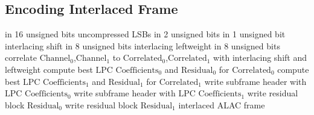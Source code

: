 \clearpage

\subsection{Encoding Interlaced Frame}
{
 in 16 unsigned bits
\WRITE uncompressed LSBs in 2 unsigned bits\;
 in 1 unsigned bit
\WRITE interlacing shift in 8 unsigned bits\;
\WRITE interlacing leftweight in 8 unsigned bits\;
correlate $\text{Channel}_0$,$\text{Channel}_1$ to $\text{Correlated}_0$,$\text{Correlated}_1$ with interlacing shift and leftweight\;
compute best $\text{LPC Coefficients}_0$ and $\text{Residual}_0$ for $\text{Correlated}_0$\;
compute best $\text{LPC Coefficients}_1$ and $\text{Residual}_1$ for $\text{Correlated}_1$\;
write subframe header with $\text{LPC Coefficients}_0$\;
write subframe header with $\text{LPC Coefficients}_1$\;
write residual block $\text{Residual}_0$\;
write residual block $\text{Residual}_1$\;
\Return interlaced ALAC frame\;
\EALGORITHM
}


